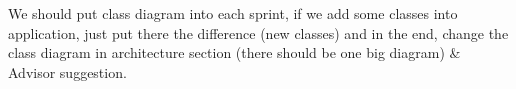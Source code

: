 \nextItem We should put class diagram into each sprint, if we add some classes into application, just put there the difference (new classes) and in the end, change the class diagram in architecture section (there should be one big diagram) & Advisor suggestion.

